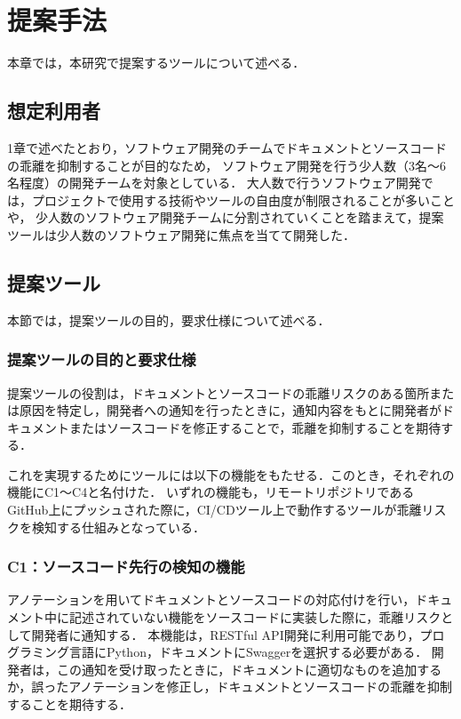 \chapter{提案手法}
本章では，本研究で提案するツールについて述べる．

\section{想定利用者}
1章で述べたとおり，ソフトウェア開発のチームでドキュメントとソースコードの乖離を抑制することが目的なため，
ソフトウェア開発を行う少人数（3名〜6名程度）の開発チームを対象としている．
大人数で行うソフトウェア開発では，プロジェクトで使用する技術やツールの自由度が制限されることが多いことや，
少人数のソフトウェア開発チームに分割されていくことを踏まえて，提案ツールは少人数のソフトウェア開発に焦点を当てて開発した．

\section{提案ツール}
本節では，提案ツールの目的，要求仕様について述べる．

\subsection{提案ツールの目的と要求仕様}
提案ツールの役割は，ドキュメントとソースコードの乖離リスクのある箇所または原因を特定し，開発者への通知を行ったときに，通知内容をもとに開発者がドキュメントまたはソースコードを修正することで，乖離を抑制することを期待する．

これを実現するためにツールには以下の機能をもたせる．このとき，それぞれの機能にC1〜C4と名付けた．
いずれの機能も，リモートリポジトリであるGitHub上にプッシュされた際に，CI/CDツール上で動作するツールが乖離リスクを検知する仕組みとなっている．

\subsection{C1：ソースコード先行の検知の機能}
アノテーションを用いてドキュメントとソースコードの対応付けを行い，ドキュメント中に記述されていない機能をソースコードに実装した際に，乖離リスクとして開発者に通知する．
本機能は，RESTful API開発に利用可能であり，プログラミング言語にPython，ドキュメントにSwaggerを選択する必要がある．
開発者は，この通知を受け取ったときに，ドキュメントに適切なものを追加するか，誤ったアノテーションを修正し，ドキュメントとソースコードの乖離を抑制することを期待する．

